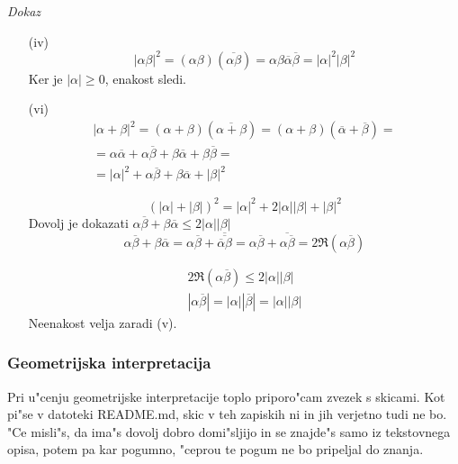 \emph{Dokaz}
\begin{itemize}
	\item[(iv)]
	\begin{equation*}
		|\alpha \beta|^2 = (\alpha \beta)(\overline{\alpha \beta}) = \alpha \beta \overline{\alpha} \overline{\beta} = |\alpha|^2 |\beta|^2
	\end{equation*}
	Ker je $|\alpha| \geq 0$, enakost sledi.
	
	\item[(vi)]
	\begin{multline*}
		|\alpha + \beta|^2 = (\alpha + \beta)(\overline{\alpha + \beta}) = (\alpha + \beta)(\overline{\alpha} + \overline{\beta}) = \\
		= \alpha \overline{\alpha} + \alpha \overline{\beta} + \beta \overline{\alpha} + \beta \overline{\beta} = \\
		= |\alpha|^2 + \alpha \overline{\beta} + \beta \overline{\alpha} + |\beta|^2
	\end{multline*}
	
	\begin{equation*}
		(|\alpha| + |\beta|)^2 = |\alpha|^2 + 2|\alpha||\beta| + |\beta|^2
	\end{equation*}
	Dovolj je dokazati $\alpha \overline{\beta} + \beta \overline{\alpha} \leq 2|\alpha||\beta|$
	\begin{equation*}
	\alpha \overline{\beta} + \beta \overline{\alpha} = \alpha \overline{\beta} + \overline{\overline{\overline{\alpha}\beta}} =
	\alpha \overline{\beta} + \overline{\alpha \overline{\beta}} = 2\Re (\alpha \overline{\beta})
	\end{equation*}
	
	\begin{gather*}
	2\Re(\alpha \overline{\beta}) \leq 2 |\alpha||\beta|\\
	|\alpha \overline{\beta}| = |\alpha||\overline{\beta}| = |\alpha||\beta|
	\end{gather*}
	Neenakost velja zaradi (v).
\end{itemize}


\subsubsection{Geometrijska interpretacija}
Pri u"cenju geometrijske interpretacije toplo priporo"cam zvezek s skicami. Kot pi"se v datoteki README.md, skic v teh zapiskih ni in jih verjetno tudi ne bo. "Ce misli"s, da ima"s dovolj dobro domi"sljijo in se znajde"s samo iz tekstovnega opisa, potem pa kar pogumno, "ceprou te pogum ne bo pripeljal do znanja.

